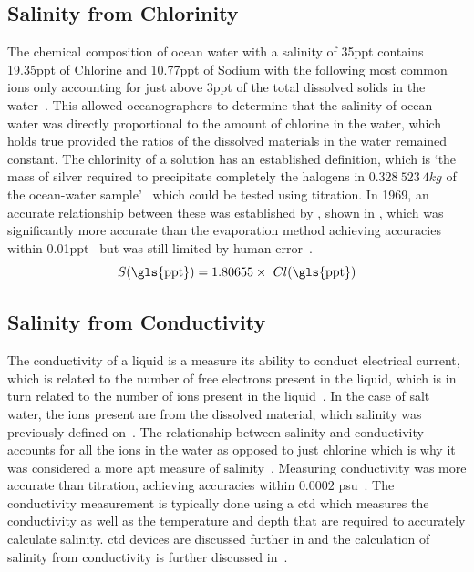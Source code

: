 \subsection{Salinity from Chlorinity}\label{subsec:salinity-from-chlorinity}

The chemical composition of ocean water with a salinity of 35\gls{ppt} contains 19.35\gls{ppt} of Chlorine and 10.77\gls{ppt} of Sodium with the following most common ions only accounting for just above 3\gls{ppt} of the total dissolved solids in the water~\cite{britannica_seawater_encyclopaedia_2024}.
This allowed oceanographers to determine that the salinity of ocean water was directly proportional to the amount of chlorine in the water, which holds true provided the ratios of the dissolved materials in the water remained constant.
The chlorinity of a solution has an established definition, which is `the mass of silver required to precipitate completely the halogens in $0.328\ 523\ 4 kg$ of the ocean-water sample'~\cite{wooster_redefinition_of_salinity_1969} which could be tested using titration.
In 1969, an accurate relationship between these was established by , shown in , which was significantly more accurate than the evaporation method achieving accuracies within 0.01\gls{ppt}~\cite{sverdrup_ocean_physics_and_chemistry_1942} but was still limited by human error~\cite{lewis_salinity_definition_and_calculation_1978}.
\begin{equation}\label{eqn:salinity-chlorinity}
 S (\text{\gls{ppt}}) = 1.80655 \times~Cl (\text{\gls{ppt}})
\end{equation}

\subsection{Salinity from Conductivity}\label{subsec:salinity-from-conductivity}

The conductivity of a liquid is a measure its ability to conduct electrical current, which is related to the number of free electrons present in the liquid, which is in turn related to the number of ions present in the liquid~\cite{stewart_introduction_to_physical_oceanography_2004}.
In the case of salt water, the ions present are from the dissolved material, which salinity was previously defined on~\cite{stewart_introduction_to_physical_oceanography_2004}.
The relationship between salinity and conductivity accounts for all the ions in the water as opposed to just chlorine which is why it was considered a more apt measure of salinity~\cite{lewis_salinity_definition_and_calculation_1978}.
Measuring conductivity was more accurate than titration, achieving accuracies within $0.0002$ \gls{psu}~\cite{seabird_salinity_accuracy}.
The conductivity measurement is typically done using a \gls{ctd} which measures the conductivity as well as the temperature and depth that are required to accurately calculate salinity.
\Gls{ctd} devices are discussed further in  and the calculation of salinity from conductivity is further discussed in~.

